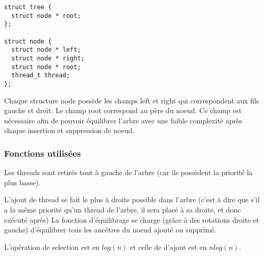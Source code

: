\begin{verbatim}
struct tree {
  struct node * root;
};

struct node {
  struct node * left;
  struct node * right;
  struct node * root;
  thread_t thread; 
};

\end{verbatim}

Chaque structure node possède les champs left et right qui
correspondent aux fils gauche et droit.  Le champ root correspond au
père du noeud. Ce champ est nécessaire afin de pouvoir équilibrer
l'arbre avec une faible complexité après chaque insertion et
suppression de noeud.

\subsubsection{Fonctions utilisées}
Les threads sont retirés tout à gauche de l'arbre (car ils possèdent
la priorité la plus basse).

L'ajout de thread se fait le plus à droite possible dans l'arbre
(c'est à dire que s'il a la même priorité qu'un thread de l'arbre, il
sera placé à sa droite, et donc exécuté après) La fonction
d'équilibrage se charge (grâce à des rotations droite et gauche)
d'équilibrer tous les ancêtres du noeud ajouté ou supprimé.

L'opération de selection est en $log(n)$ et celle de d'ajout est en
$nlog(n)$.
